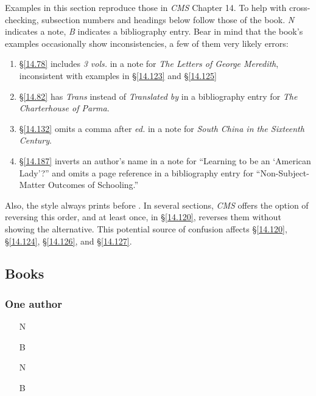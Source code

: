 \documentclass[11pt,letterpaper,oneside]{article}
\begin{document}
Examples in this section reproduce those in \textit{CMS} Chapter 14.
To help with cross-checking, subsection numbers and headings below
follow those of the book. \textit{N} indicates a note, \textit{B}
indicates a bibliography entry. Bear in mind that the book's examples
occasionally show inconsistencies, a few of them very likely errors:

\begin{enumerate}
\item \S\ref{14.78} includes \textit{3 vols.} in a note for
\textit{The Letters of George Meredith}, inconsistent with examples in
\S\ref{14.123} and \S\ref{14.125}

\item \S\ref{14.82} has \textit{Trans} instead of \textit{Translated
by} in a bibliography entry for \textit{The Charterhouse of Parma}.

\item \S\ref{14.132} omits a comma after \textit{ed.} in a note for
\textit{South China in the Sixteenth Century}.

\item \S\ref{14.187} inverts an author's name in a note for ``Learning
to be an `American Lady'?'' and omits a page reference in a
bibliography entry for ``Non-Subject-Matter Outcomes of Schooling.''
\end{enumerate}

\noindent Also, the style always prints  before
. In several sections, \textit{CMS} offers the
option of reversing this order, and at least once, in \S\ref{14.120},
reverses them without showing the alternative. This potential source
of confusion affects \S\ref{14.120}, \S\ref{14.124}, \S\ref{14.126},
and \S\ref{14.127}.

\subsection{Books}
\setcounter{subsection}{14}

\setcounter{subsubsection}{74}
\subsubsection{One author}

\begin{itemize}
\item[N] 

\item[B] 

\item[N] 

\item[B] 
\end{itemize}
\end{document}
